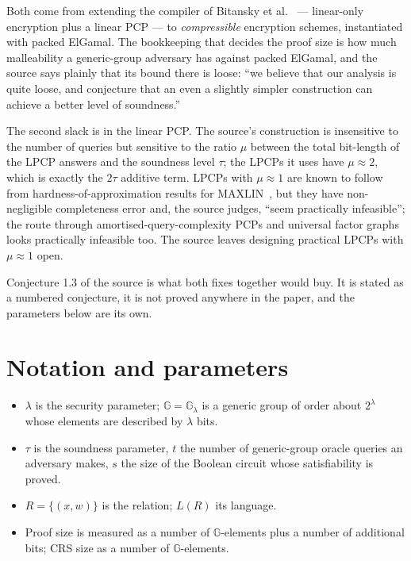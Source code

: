 \documentclass{aicr-conjecture}
\newcommand{\G}{\mathbb{G}}
\begin{document}
Both come from extending the compiler of Bitansky et
al.~\cite{BCIOP22} --- linear-only encryption plus a linear PCP --- to
\emph{compressible} encryption schemes, instantiated with packed
ElGamal. The bookkeeping that decides the proof size is how much
malleability a generic-group adversary has against packed ElGamal, and
the source says plainly that its bound there is loose: ``we believe that
our analysis is quite loose, and conjecture that an even a slightly
simpler construction can achieve a better level of soundness.''

The second slack is in the linear PCP\@. The source's construction is
insensitive to the number of queries but sensitive to the ratio $\mu$
between the total bit-length of the LPCP answers and the soundness level
$\tau$; the LPCPs it uses have $\mu \approx 2$, which is exactly the
$2\tau$ additive term. LPCPs with $\mu \approx 1$ are known to follow
from hardness-of-approximation results for
$\mathrm{MAXLIN}$~\cite{Has01}, but they have non-negligible completeness
error and, the source judges, ``seem practically infeasible''; the route
through amortised-query-complexity PCPs and universal factor graphs looks
practically infeasible too. The source leaves designing practical LPCPs
with $\mu \approx 1$ open.

Conjecture 1.3 of the source is what both fixes together would buy. It
is stated as a numbered conjecture, it is not proved anywhere in the
paper, and the parameters below are its own.

\section{Notation and parameters}\label{sec:notation}

\begin{itemize}[nosep]
  \item $\lambda$ is the security parameter; $\G = \G_{\lambda}$ is a
    generic group of order about $2^{\lambda}$ whose elements are
    described by $\lambda$ bits.
  \item $\tau$ is the soundness parameter, $t$ the number of generic-group
    oracle queries an adversary makes, $s$ the size of the Boolean
    circuit whose satisfiability is proved.
  \item $R = \{(x,w)\}$ is the relation; $L(R)$ its language.
  \item Proof size is measured as a number of $\G$-elements plus a number
    of additional bits; CRS size as a number of $\G$-elements.
\end{itemize}
\end{document}
